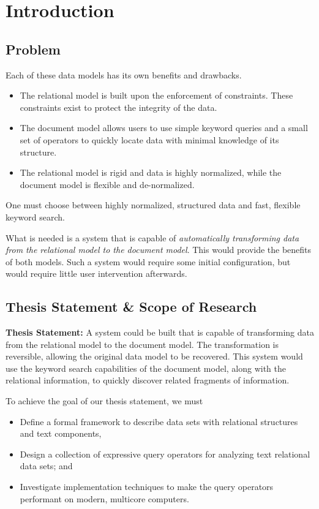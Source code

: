 \chapter{Introduction}
	
	
	\section{Problem}
		Each of these data models has its own benefits and drawbacks.
		
		\begin{itemize}
			\item The relational model is built upon the enforcement of constraints.  These constraints exist to protect the integrity of the data.
			\item The document model allows users to use simple keyword queries and a small set of operators to quickly locate data with minimal knowledge of its structure.
			\item The relational model is rigid and data is highly normalized, while the document model is flexible and de-normalized.
		\end{itemize}
		
		One must choose between highly normalized, structured data and fast, flexible keyword search.
		
		What is needed is a system that is capable of \textit{automatically transforming data from the relational model to the document model}.  This would provide the benefits of both models.  Such a system would require some initial configuration, but would require little user intervention afterwards.
	
	\section{Thesis Statement \& Scope of Research}
		\begin{displayquote}
			\textbf{Thesis Statement:}  A system could be built that is capable of transforming data from the relational model to the document model.  The transformation is reversible, allowing the original data model to be recovered.  This system would use the keyword search capabilities of the document model, along with the relational information, to quickly discover related fragments of information.
		\end{displayquote}
		
		To achieve the goal of our thesis statement, we must
		
		\begin{itemize}
			\item Define a formal framework to describe data sets with relational structures and text components,
			\item Design a collection of expressive query operators for analyzing text relational data sets; and
			\item Investigate implementation techniques to make the query operators performant on modern, multicore computers.
		\end{itemize}
		
